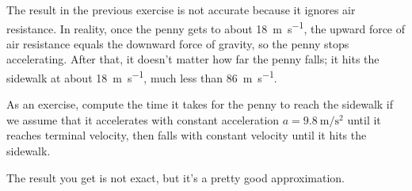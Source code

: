 \begin{ex}
The result in the previous exercise is not accurate because it ignores air resistance.  In reality, once the penny gets to about \SI{18}{\meter\per\second}, the upward force of air resistance equals the downward force of gravity, so the penny stops accelerating.  After that, it doesn't matter how far the penny falls; it hits the sidewalk at about \SI{18}{\meter\per\second}, much less than \SI{86}{\meter\per\second}.

As an exercise, compute the time it takes for the penny to reach the sidewalk if we assume that it accelerates with constant acceleration
$a = \SI{9.8}{\meter\per\second\squared}$ until it reaches terminal velocity, then falls with constant velocity until it hits the sidewalk.

The result you get is not exact, but it's a pretty good approximation.
\end{ex}
